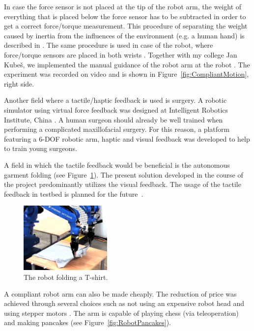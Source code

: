         In case the force sensor is not placed at the tip of the robot arm, the weight of everything that is placed below the force sensor has to be subtracted in order to get a correct force/torque measurement. This procedure of separating the weight caused by inertia from the influences of the environment (e.g. a human hand) is described in \cite{2006Kroger6DForceSensorFusionIROS}. The same procedure is used in case of the \CloPeMa\/ robot, where force/torque sensors are placed in both wrists \cite{KubesForceSensor}. Together with my college Jan Kubeš, we implemented the manual guidance of the robot arm at the \CloPeMa\/ robot \cite{PreDiplomaLejsekHlavac}. The experiment was recorded on video \cite{ClopemaCompliantMotionKubesLejsek} and is shown in Figure~\ref{fig:CompliantMotion}, right side.

        Another field where a tactile/haptic feedback is used is surgery. A robotic simulator using virtual force feedback was designed at Intelligent Robotics Institute, China \cite{syed2011maxillofacial}. A human surgeon should already be well trained when performing a complicated maxillofacial surgery. For this reason, a platform featuring a 6-DOF robotic arm, haptic and visual feedback was developed to help to train young surgeons.

        A field in which the tactile feedback would be beneficial is the autonomous garment folding (see Figure~\ref{fig:ClopemaFoldingTShirt}). The present solution developed in the course of the \CloPeMa\/ project predominantly utilizes the visual feedback. The usage of the tactile feedback in \CloPeMa\/ testbed is planned for the future~\cite{stria2014garment}.

        \begin{figure}[h]
        \includegraphics[width=0.4\textwidth]{ClopemaFoldingTShirt.png}
        \centering
        \caption{The \CloPeMa\/ robot folding a T-shirt.}
        \label{fig:ClopemaFoldingTShirt}
        \end{figure}

        A compliant robot arm can also be made cheaply. The reduction of price was achieved through several choices such as not using an expensive robot head and using stepper motors \cite{quigley2011low}. The arm is capable of playing chess (via teleoperation) and making pancakes (see Figure~\ref{fig:RobotPancakes}).

